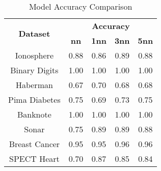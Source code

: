 \begin{table}[htbp]
\caption{Model Accuracy Comparison}
\begin{center}
\begin{tabular}{|c|c|c|c|c|}
\hline
\multirow{2}{*}{\textbf{Dataset}} & \multicolumn{4}{c|}{\textbf{Accuracy}} \\ \cline{2-5}
 & \textbf{nn} & \textbf{1nn} & \textbf{3nn} & \textbf{5nn} \\ \hline
Ionosphere & 0.88 & 0.86 & 0.89 & 0.88 \\ \hline
Binary Digits & 1.00 & 1.00 & 1.00 & 1.00 \\ \hline
Haberman & 0.67 & 0.70 & 0.68 & 0.68 \\ \hline
Pima Diabetes & 0.75 & 0.69 & 0.73 & 0.75 \\ \hline
Banknote & 1.00 & 1.00 & 1.00 & 1.00 \\ \hline
Sonar & 0.75 & 0.89 & 0.89 & 0.88 \\ \hline
Breast Cancer & 0.95 & 0.95 & 0.96 & 0.96 \\ \hline
SPECT Heart & 0.70 & 0.87 & 0.85 & 0.84 \\ \hline
\end{tabular}
\label{tab:accuracy}
\end{center}
\end{table}